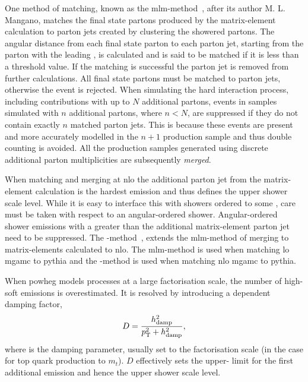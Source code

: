 One method of matching, known as the \acrshort{mlm}-method~\cite{Gen:MLM}, after its author M. L. Mangano, matches the final state partons produced by the matrix-element calculation to parton jets created by clustering the showered partons.
The angular distance from each final state parton to each parton jet, starting from the parton with the leading \pt{}, is calculated and is said to be matched if it is less than a threshold value.
If the matching is successful the parton jet is removed from further calculations.
All final state partons must be matched to parton jets, otherwise the event is rejected.
When simulating the hard interaction process, including contributions with up to $N$ additional partons, events in samples simulated with $n$ additional partons, where $n<N$, are suppressed if they do not contain exactly $n$ matched parton jets.
This is because these events are present and more accurately modelled in the $n+1$ production sample and thus double counting is avoided.
All the production samples generated using discrete additional parton multiplicities are subsequently \textit{merged}.

When matching and merging at \acrshort{nlo} the additional parton jet from the matrix-element calculation is the hardest emission and thus defines the upper shower scale level.
While it is easy to interface this with showers ordered to some \pt{}, care must be taken with respect to an angular-ordered shower.
Angular-ordered shower emissions with a \pt{} greater than the additional matrix-element parton jet need to be suppressed.
The \FxFx{}-method~\cite{Gen:FXFX}, extends the \acrshort{mlm}-method of merging to matrix-elements calculated to \acrshort{nlo}.
The \acrshort{mlm}-method is used when matching \acrshort{lo} \acrshort{mgamc} to \acrshort{pythia} and the \FxFx{}-method is used when matching \acrshort{nlo} \acrshort{mgamc} to \acrshort{pythia}.

When \acrshort{powheg} models processes at a large factorisation scale, the number of high-\pt{} soft emissions is overestimated. 
It is resolved by introducing a \pt{} dependent damping factor, 
\begin{equation*}
	D = \frac{h_{\mathrm{damp}}^2}{p_{\mathrm{T}}^2+h_{\mathrm{damp}}^2},
\end{equation*}
where \hdamp{} is the damping parameter, usually set to the factorisation scale (in the case for top quark production to $m_t$).
$D$ effectively sets the upper-\pt{} limit for the first additional emission and hence the upper shower scale level.


